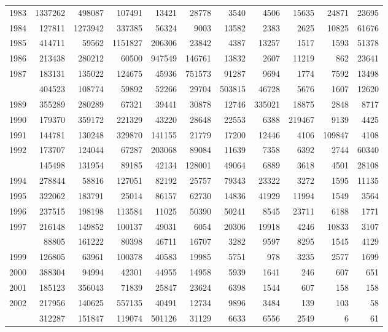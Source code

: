 \documentclass[
]{article}
\begin{document}
\begin{longtable}[t]{lrrrrrrrrrr}
1983 & 1337262 & 498087 & 107491 & 13421 & 28778 & 3540 & 4506 & 15635 & 24871 & 23695\\
1984 & 127811 & 1273942 & 337385 & 56324 & 9003 & 13582 & 2383 & 2625 & 10825 & 61676\\
1985 & 414711 & 59562 & 1151827 & 206306 & 23842 & 4387 & 13257 & 1517 & 1593 & 51378\\
1986 & 213438 & 280212 & 60500 & 947549 & 146761 & 13832 & 2607 & 11219 & 862 & 23641\\
1987 & 183131 & 135022 & 124675 & 45936 & 751573 & 91287 & 9694 & 1774 & 7592 & 13498\\
\addlinespace
1988 & 404523 & 108774 & 59892 & 52266 & 29704 & 503815 & 46728 & 5676 & 1607 & 12620\\
1989 & 355289 & 280289 & 67321 & 39441 & 30878 & 12746 & 335021 & 18875 & 2848 & 8717\\
1990 & 179370 & 359172 & 221329 & 43220 & 28648 & 22553 & 6388 & 219467 & 9139 & 4425\\
1991 & 144781 & 130248 & 329870 & 141155 & 21779 & 17200 & 12446 & 4106 & 109847 & 4108\\
1992 & 173707 & 124044 & 67287 & 203068 & 89084 & 11639 & 7358 & 6392 & 2744 & 60340\\
\addlinespace
1993 & 145498 & 131954 & 89185 & 42134 & 128001 & 49064 & 6889 & 3618 & 4501 & 28108\\
1994 & 278844 & 58816 & 127051 & 82192 & 25757 & 79343 & 23322 & 3272 & 1595 & 11135\\
1995 & 322062 & 183791 & 25014 & 86157 & 62730 & 14836 & 41929 & 11994 & 1549 & 3564\\
1996 & 237515 & 198198 & 113584 & 11025 & 50390 & 50241 & 8545 & 23711 & 6188 & 1771\\
1997 & 216148 & 149852 & 100137 & 49031 & 6054 & 20306 & 19918 & 4246 & 10833 & 3107\\
\addlinespace
1998 & 88805 & 161222 & 80398 & 46711 & 16707 & 3282 & 9597 & 8295 & 1545 & 4129\\
1999 & 126805 & 63961 & 100378 & 40583 & 19985 & 5751 & 978 & 3235 & 2577 & 1699\\
2000 & 388304 & 94994 & 42301 & 44955 & 14958 & 5939 & 1641 & 246 & 607 & 651\\
2001 & 185123 & 356043 & 71839 & 25847 & 23624 & 6398 & 1544 & 607 & 158 & 158\\
2002 & 217956 & 140625 & 557135 & 40491 & 12734 & 9896 & 3484 & 139 & 103 & 58\\
\addlinespace
2003 & 312287 & 151847 & 119074 & 501126 & 31129 & 6633 & 6556 & 2549 & 6 & 61\\

\end{longtable}
\end{document}
